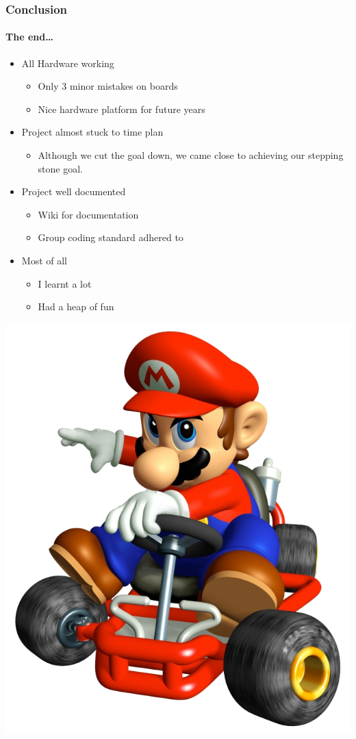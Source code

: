 \documentclass{beamer}
\begin{document}
\begin{frame}
\frametitle{Conclusion}
\framesubtitle{The end\ldots}
\begin{itemize}
\item All Hardware working
  \begin{itemize}
  \item Only 3 minor mistakes on boards
  \item Nice hardware platform for future years
  \end{itemize}
\item Project almost stuck to time plan
  \begin{itemize}
  \item Although we cut the goal down, we came close to achieving our stepping
  stone goal.
  \end{itemize}
\item Project well documented
  \begin{itemize}
  \item Wiki for documentation
  \item Group coding standard adhered to
  \end{itemize}
\item Most of all
  \begin{itemize}
  \item I learnt a lot
  \item Had a heap of fun
  \end{itemize}
\end{itemize}
\end{frame}

\begin{frame}
\begin{center}
\includegraphics[width=.70\textwidth]{Images/Mario}
\end{center}
\end{frame}
\end{document}
